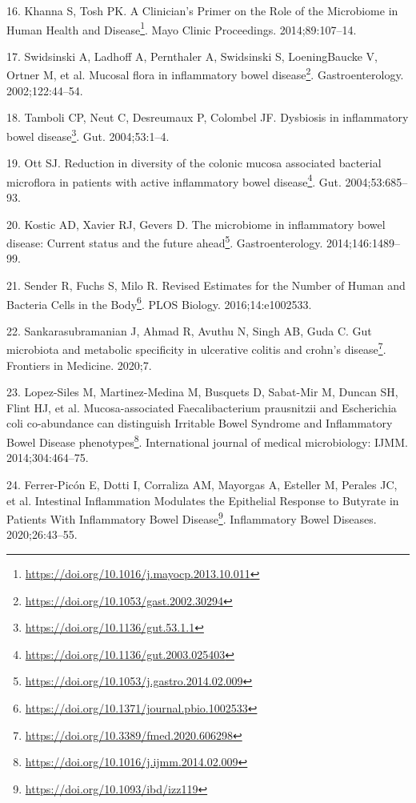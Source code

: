 \documentclass[
  a4paper,
]{book}
\DeclareRobustCommand{\href}[2]{#2\footnote{\url{#1}}}
\newlength{\cslhangindent}
\newlength{\cslentryspacingunit} %
\newenvironment{CSLReferences}[2] %
 {%
  \setlength{\parindent}{0pt}
  \ifodd #1
  \let\oldpar\par
  \def\par{\hangindent=\cslhangindent\oldpar}
  \fi
  \setlength{\parskip}{#2\cslentryspacingunit}
 }%
 {}
\begin{document}
\begin{CSLReferences}{0}{0}
\leavevmode{}%
16. Khanna S, Tosh PK. \href{https://doi.org/10.1016/j.mayocp.2013.10.011}{A Clinician's Primer on the Role of the Microbiome in Human Health and Disease}. Mayo Clinic Proceedings. 2014;89:107--14.

\leavevmode{}%
17. Swidsinski A, Ladhoff A, Pernthaler A, Swidsinski S, LoeningBaucke V, Ortner M, et al. \href{https://doi.org/10.1053/gast.2002.30294}{Mucosal flora in inflammatory bowel disease}. Gastroenterology. 2002;122:44--54.

\leavevmode{}%
18. Tamboli CP, Neut C, Desreumaux P, Colombel JF. \href{https://doi.org/10.1136/gut.53.1.1}{Dysbiosis in inflammatory bowel disease}. Gut. 2004;53:1--4.

\leavevmode{}%
19. Ott SJ. \href{https://doi.org/10.1136/gut.2003.025403}{Reduction in diversity of the colonic mucosa associated bacterial microflora in patients with active inflammatory bowel disease}. Gut. 2004;53:685--93.

\leavevmode{}%
20. Kostic AD, Xavier RJ, Gevers D. \href{https://doi.org/10.1053/j.gastro.2014.02.009}{The microbiome in inflammatory bowel disease: Current status and the future ahead}. Gastroenterology. 2014;146:1489--99.

\leavevmode{}%
21. Sender R, Fuchs S, Milo R. \href{https://doi.org/10.1371/journal.pbio.1002533}{Revised Estimates for the Number of Human and Bacteria Cells in the Body}. PLOS Biology. 2016;14:e1002533.

\leavevmode{}%
22. Sankarasubramanian J, Ahmad R, Avuthu N, Singh AB, Guda C. \href{https://doi.org/10.3389/fmed.2020.606298}{Gut microbiota and metabolic specificity in ulcerative colitis and crohn's disease}. Frontiers in Medicine. 2020;7.

\leavevmode{}%
23. Lopez-Siles M, Martinez-Medina M, Busquets D, Sabat-Mir M, Duncan SH, Flint HJ, et al. \href{https://doi.org/10.1016/j.ijmm.2014.02.009}{Mucosa-associated Faecalibacterium prausnitzii and Escherichia coli co-abundance can distinguish Irritable Bowel Syndrome and Inflammatory Bowel Disease phenotypes}. International journal of medical microbiology: IJMM. 2014;304:464--75.

\leavevmode{}%
24. Ferrer-Picón E, Dotti I, Corraliza AM, Mayorgas A, Esteller M, Perales JC, et al. \href{https://doi.org/10.1093/ibd/izz119}{Intestinal Inflammation Modulates the Epithelial Response to Butyrate in Patients With Inflammatory Bowel Disease}. Inflammatory Bowel Diseases. 2020;26:43--55.


\end{CSLReferences}
\end{document}
